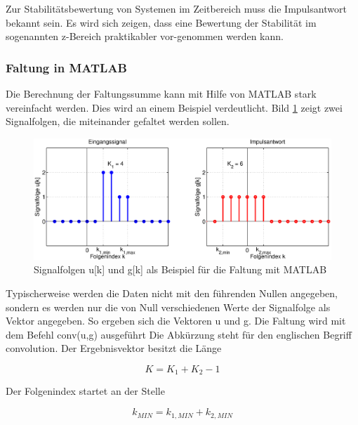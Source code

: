 \noindent Zur Stabilitätsbewertung von Systemen im Zeitbereich muss die Impulsantwort bekannt sein. Es wird sich zeigen, dass eine Bewertung der Stabilität im sogenannten z-Bereich praktikabler vor-genommen werden kann.

\clearpage

\subsubsection{Faltung in MATLAB}

\noindent Die Berechnung der Faltungssumme kann mit Hilfe von MATLAB stark vereinfacht werden. Dies wird an einem Beispiel verdeutlicht. Bild \ref{fig:FaltungMatlab} zeigt zwei Signalfolgen, die miteinander gefaltet werden sollen.

\begin{figure}[H]
  \centerline{\includegraphics[width=1\textwidth]{Kapitel4/Bilder/image17.eps}}
  \caption{Signalfolgen u[k] und g[k] als Beispiel f\"{u}r die Faltung mit MATLAB}
  \label{fig:FaltungMatlab}
\end{figure}

\noindent Typischerweise werden die Daten nicht mit den f\"{u}hrenden Nullen angegeben, sondern es werden nur die von Null verschiedenen Werte der Signalfolge als Vektor angegeben. So ergeben sich die Vektoren u und g. Die Faltung wird mit dem Befehl conv(u,g) ausgef\"{u}hrt Die Abk\"{u}rzung steht f\"{u}r den englischen Begriff convolution. Der Ergebnisvektor besitzt die L\"{a}nge 

\begin{equation}\label{eq:fouronehundredtwo}
K=K_{1} +K_{2} -1
\end{equation}

\noindent Der Folgenindex startet an der Stelle 

\begin{equation}\label{eq:fouronehundredthree}
k_{MIN} =k_{1,MIN} +k_{2,MIN} 
\end{equation}

